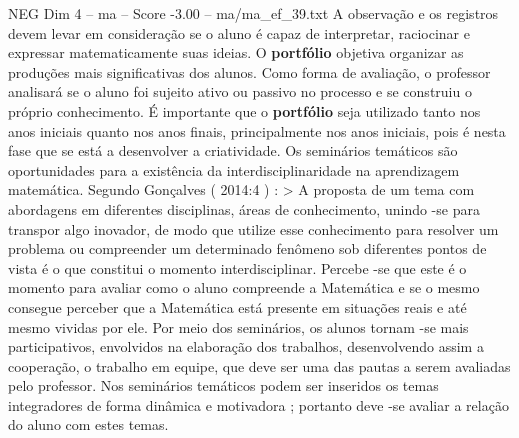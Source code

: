 \begin{textsample}{NEG Dim 4 – ma – Score -3.00 – ma/ma\_ef\_39.txt}
A observação e os registros devem levar em consideração se o aluno é capaz de interpretar, raciocinar e expressar matematicamente suas ideias.
O \textbf{portfólio} objetiva organizar as produções mais significativas dos alunos.
Como forma de avaliação, o professor analisará se o aluno foi sujeito ativo ou passivo no processo e se construiu o próprio conhecimento.
É importante que o \textbf{portfólio} seja utilizado tanto nos anos iniciais quanto nos anos finais, principalmente nos anos iniciais, pois é nesta fase que se está a desenvolver a criatividade.
Os seminários temáticos são oportunidades para a existência da interdisciplinaridade na aprendizagem matemática.
Segundo Gonçalves ( 2014:4 ) : > A proposta de um tema com abordagens em diferentes disciplinas, áreas de conhecimento, unindo -se para transpor algo inovador, de modo que utilize esse conhecimento para resolver um problema ou compreender um determinado fenômeno sob diferentes pontos de vista é o que constitui o momento interdisciplinar.
Percebe -se que este é o momento para avaliar como o aluno compreende a Matemática e se o mesmo consegue perceber que a Matemática está presente em situações reais e até mesmo vividas por ele.
Por meio dos seminários, os alunos tornam -se mais participativos, envolvidos na elaboração dos trabalhos, desenvolvendo assim a cooperação, o trabalho em equipe, que deve ser uma das pautas a serem avaliadas pelo professor.
Nos seminários temáticos podem ser inseridos os temas integradores de forma dinâmica e motivadora ; portanto deve -se avaliar a relação do aluno com estes temas.

\end{textsample}
